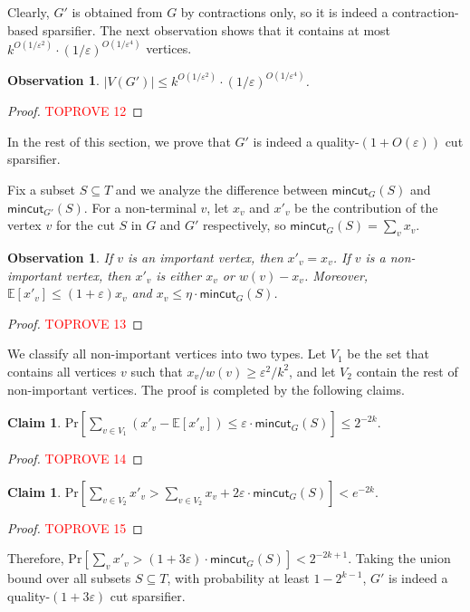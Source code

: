 \documentclass[11pt]{article}
\newtheorem{observation}[theorem]{Observation}
\theoremstyle{definition}
\newtheorem{claim}[theorem]{Claim}
\newcommand{\eps}{{\varepsilon}}
\def\pr#1{\mathrm{Pr}\left[ #1 \right]}
\def\ex#1{{\mathbb{E}}\left[ #1 \right]}
\newcommand{\mc}{\mathsf{mincut}}
\begin{document}
Clearly, $G'$ is obtained from $G$ by contractions only, so it is indeed a contraction-based sparsifier. The next observation shows that it contains at most 
$k^{O(1/\eps^2)}\cdot (1/\eps)^{O(1/\eps^4)}$ vertices.

\begin{observation}
$|V(G')|\le k^{O(1/\eps^2)}\cdot (1/\eps)^{O(1/\eps^4)}$.
\end{observation} 
\begin{proof}\textcolor{red}{TOPROVE 12}\end{proof}

In the rest of this section, we prove that $G'$ is indeed a quality-$(1+O(\eps))$ cut sparsifier.

Fix a subset $S\subseteq T$ and we analyze the difference between $\mc_G(S)$ and $\mc_{G'}(S)$.
For a non-terminal $v$, let $x_v$ and $x'_v$ be the contribution of the vertex $v$ for the cut $S$ in $G$ and $G'$ respectively, so $\mc_G(S) = \sum_v x_v$. 

\begin{observation}
If $v$ is an important vertex, then $x'_v=x_v$. If $v$ is a non-important vertex, then $x'_v$ is either $x_v$ or $w(v)-x_v$. Moreover, $\ex{x'_v} \le (1+\eps)x_v$ and $x_v \le \eta \cdot \mc_G(S)$.
\end{observation}
\begin{proof}\textcolor{red}{TOPROVE 13}\end{proof}

We classify all non-important vertices into two types. 
Let $V_1$ be the set that contains all vertices $v$ such that $x_v/w(v) \ge \eps^2/k^2$, and let $V_2$ contain the rest of non-important vertices. 
The proof is completed by the following claims.

\begin{claim}
$\pr{\sum_{v \in V_1} (x'_v - \ex{x'_v}) \le \eps\cdot \mc_G(S)} \le 2^{-2k}$.
\end{claim}
\begin{proof}\textcolor{red}{TOPROVE 14}\end{proof}


\begin{claim}
$\pr{\sum_{v\in V_2} x'_v > \sum_{v\in V_2} x_v + 2\eps\cdot \mc_G(S)} <e^{-2k}$.
\end{claim}
\begin{proof}\textcolor{red}{TOPROVE 15}\end{proof}

Therefore, $\pr{\sum_v x'_v > (1+3\eps)\cdot\mc_G(S)} < 2^{-2k+1}$. Taking the union bound over all subsets $S\subseteq T$, with probability at least $1-2^{k-1}$, $G'$ is indeed a quality-$(1+3\eps)$ cut sparsifier.
\end{document}
